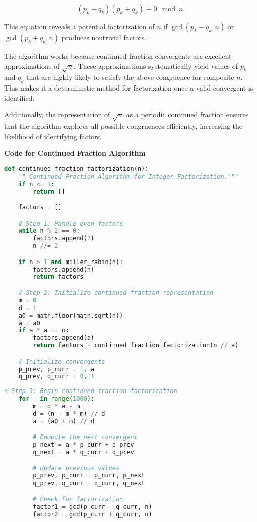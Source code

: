 \documentclass[12pt]{report}
\begin{document}
\[
(p_k - q_k)(p_k + q_k) \equiv 0 \mod n.
\]

This equation reveals a potential factorization of $n$ if $\gcd(p_k - q_k, n)$ or $\gcd(p_k + q_k, n)$ produces nontrivial factors. 

The algorithm works because continued fraction convergents are excellent approximations of $\sqrt{n}$. These approximations systematically yield values of $p_k$ and $q_k$ that are highly likely to satisfy the above congruence for composite $n$. This makes it a deterministic method for factorization once a valid convergent is identified.

Additionally, the representation of $\sqrt{n}$ as a periodic continued fraction ensures that the algorithm explores all possible congruences efficiently, increasing the likelihood of identifying factors.


\begin{center}
    \item \textbf{Code for Continued Fraction Algorithm}
\end{center}

\begin{lstlisting}[language=Python]
def continued_fraction_factorization(n):
    """Continued Fraction Algorithm for Integer Factorization."""
    if n <= 1:
        return []

    factors = []

    # Step 1: Handle even factors
    while n % 2 == 0:
        factors.append(2)
        n //= 2

    if n > 1 and miller_rabin(n):
        factors.append(n)
        return factors

    # Step 2: Initialize continued fraction representation
    m = 0
    d = 1
    a0 = math.floor(math.sqrt(n))
    a = a0
    if a * a == n:
        factors.append(a)
        return factors + continued_fraction_factorization(n // a)

    # Initialize convergents
    p_prev, p_curr = 1, a
    q_prev, q_curr = 0, 1
\end{lstlisting}  

\clearpage

\begin{lstlisting}[language=Python]
    # Step 3: Begin continued fraction factorization
    for _ in range(1000):
        m = d * a - m
        d = (n - m * m) // d
        a = (a0 + m) // d

        # Compute the next convergent
        p_next = a * p_curr + p_prev
        q_next = a * q_curr + q_prev

        # Update previous values
        p_prev, p_curr = p_curr, p_next
        q_prev, q_curr = q_curr, q_next

        # Check for factorization
        factor1 = gcd(p_curr - q_curr, n)
        factor2 = gcd(p_curr + q_curr, n)

\end{lstlisting}  
\end{document}
